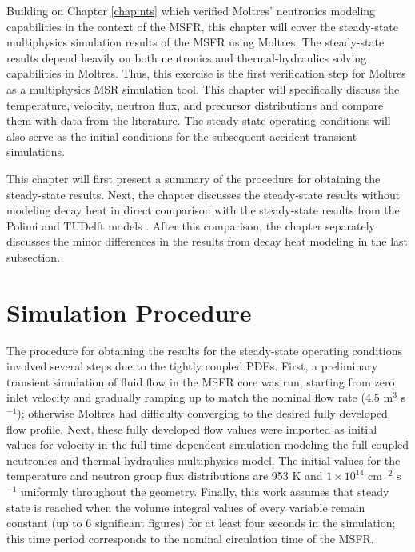 Building on Chapter \ref{chap:nts} which verified Moltres' neutronics modeling
capabilities in the context of the \gls{MSFR}, this chapter will cover the
steady-state multiphysics simulation results of the \gls{MSFR} using Moltres.
The steady-state results depend heavily on both neutronics and
thermal-hydraulics solving capabilities in Moltres. Thus, this exercise is the
first verification step for Moltres as a multiphysics \gls{MSR} simulation
tool. This chapter will specifically discuss the temperature, velocity,
neutron flux, and precursor distributions and compare them with data from the
literature. The steady-state operating conditions will also serve as the
initial conditions for the subsequent accident transient simulations.

This chapter will first
present a summary of the procedure for obtaining the steady-state results.
Next, the chapter discusses the steady-state results without modeling decay
heat in direct comparison with the steady-state results from the Polimi and
TUDelft models \cite{aufiero_development_2014}. After this
comparison, the chapter separately discusses the minor differences in the
results from decay heat modeling in the last subsection.

\section{Simulation Procedure}

The procedure for obtaining the results for the steady-state operating
conditions involved several steps
due to the tightly coupled \glspl{PDE}. First, a preliminary transient
simulation of fluid flow in the \gls{MSFR} core was run, starting from zero
inlet velocity and gradually ramping up to match the nominal flow rate (4.5
m$^3$ s$^{-1}$); otherwise Moltres had difficulty converging to the desired
fully developed flow profile.
Next, these fully developed flow values were imported as initial values for
velocity in the full time-dependent simulation modeling the full coupled
neutronics and thermal-hydraulics multiphysics model. The initial values for
the temperature and neutron group flux distributions are 953 K and
$1 \times 10^{14}$ cm$^{-2}$ s$^{-1}$ uniformly throughout the geometry.
Finally, this work assumes that steady state is reached when the volume
integral values of every variable remain constant (up to 6 significant
figures) for at least four seconds in the simulation; this
time period corresponds to the nominal circulation time of the \gls{MSFR}.

